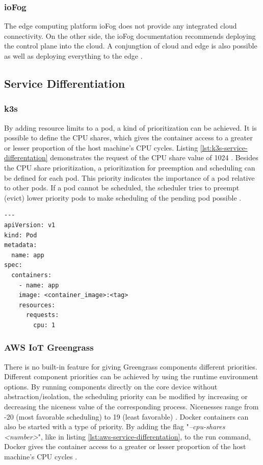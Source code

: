 \subsubsection*{ioFog}
The edge computing platform ioFog does not provide any integrated cloud connectivity. On the other side, the ioFog documentation recommends deploying the control plane into the cloud. A conjungtion of cloud and edge is also possible as well as deploying everything to the edge \cite{ioFogArchitecture}.
\subsection*{Service Differentiation}
\subsubsection*{k3s} 
By adding resource limits to a pod, a kind of prioritization can be achieved. It is possible to define the CPU shares, which gives the container access to a greater or lesser proportion of the host machine’s CPU cycles. Listing \ref{lst:k3s-service-differentation} demonstrates the request of the CPU share value of 1024 \cite{DockerDocsResourceConstraints} \cite{KubernetesResourceConstraints}. Besides the CPU share prioritization, a prioritization for preemption and scheduling can be defined for each pod. This priority indicates the importance of a pod relative to other pods. If a pod cannot be scheduled, the scheduler tries to preempt (evict) lower priority pods to make scheduling of the pending pod possible \cite{KubernetesPriorityAndPreemption}.

\begin{lstlisting}[caption={Running pod with the CPU share value of 1024.},label={lst:k3s-service-differentation},captionpos=b]
---
apiVersion: v1
kind: Pod
metadata:
  name: app
spec:
  containers:
    - name: app
    image: <container_image>:<tag>
    resources:
      requests:
        cpu: 1
\end{lstlisting}
    
\subsubsection*{AWS IoT Greengrass}
There is no built-in feature for giving Greengrass components different priorities. Different component priorities can be achieved by using the runtime environment options. By running components directly on the core device without abstraction/isolation, the scheduling priority can be modified by increasing or decreasing the niceness value of the corresponding process. Nicenesses range from -20 (most favorable scheduling) to 19 (least favorable) \cite{nice}. Docker containers can also be started with a type of priority. By adding the flag "\textit{--cpu-shares <number>}", like in listing \ref{lst:aws-service-differentation}, to the run command, Docker gives the container access to a greater or lesser proportion of the host machine’s CPU cycles \cite{DockerDocsResourceConstraints}.

